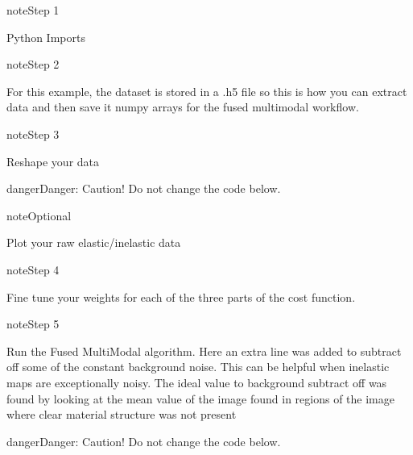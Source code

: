 \documentclass[letterpaper,10pt,english]{jupyterBook}
\begin{document}
\begin{sphinxadmonition}{note}{Step 1}

\sphinxAtStartPar
Python Imports
\end{sphinxadmonition}

\begin{sphinxadmonition}{note}{Step 2}

\sphinxAtStartPar
For this example, the dataset is stored in a .h5 file so this is how you can extract data and then save it numpy arrays for the fused multi\sphinxhyphen{}modal workflow.
\end{sphinxadmonition}

\begin{sphinxadmonition}{note}{Step 3}

\sphinxAtStartPar
Reshape your data
\end{sphinxadmonition}

\begin{sphinxadmonition}{danger}{Danger:}
\sphinxAtStartPar
Caution!
Do not change the code below.
\end{sphinxadmonition}

\begin{sphinxadmonition}{note}{Optional}

\sphinxAtStartPar
Plot your raw elastic/inelastic data
\end{sphinxadmonition}

\begin{sphinxadmonition}{note}{Step 4}

\sphinxAtStartPar
Fine tune your weights for each of the three parts of the cost function.
\end{sphinxadmonition}

\begin{sphinxadmonition}{note}{Step 5}

\sphinxAtStartPar
Run the Fused Multi\sphinxhyphen{}Modal algorithm. Here an extra line was added to subtract off some of the constant background noise.  This can be helpful when inelastic maps are exceptionally noisy.  The ideal value to background subtract off was found by looking at the mean value of the image found in regions of the image where clear material structure was not present
\end{sphinxadmonition}

\begin{sphinxadmonition}{danger}{Danger:}
\sphinxAtStartPar
Caution!
Do not change the code below.
\end{sphinxadmonition}
\end{document}
